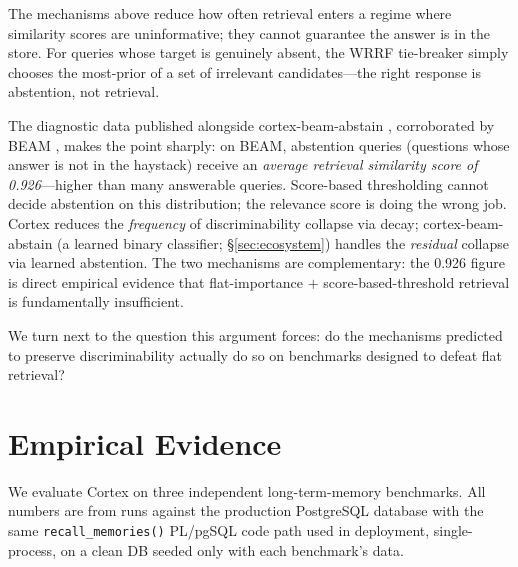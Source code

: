 \documentclass[11pt]{article}
\begin{document}
The mechanisms above reduce how often retrieval enters a regime
where similarity scores are uninformative; they cannot guarantee the
answer is in the store.  For queries whose target is genuinely
absent, the WRRF tie-breaker simply chooses the most-prior of a set
of irrelevant candidates---the right response is abstention, not
retrieval.

The diagnostic data published alongside cortex-beam-abstain
\citep{Deust2026a}, corroborated by BEAM \citep{Tavakoli2026},
makes the point sharply: on BEAM, abstention queries (questions
whose answer is not in the haystack) receive an \emph{average
retrieval similarity score of 0.926}---higher than many answerable
queries.  Score-based thresholding cannot decide abstention on this
distribution; the relevance score is doing the wrong job.  Cortex
reduces the \emph{frequency} of discriminability collapse via decay;
cortex-beam-abstain (a learned binary classifier;
\S\ref{sec:ecosystem}) handles the \emph{residual} collapse via
learned abstention.  The two mechanisms are complementary: the
0.926 figure is direct empirical evidence that flat-importance
$+$ score-based-threshold retrieval is fundamentally insufficient.

We turn next to the question this argument forces: do the
mechanisms predicted to preserve discriminability actually do so on
benchmarks designed to defeat flat retrieval?

\section{Empirical Evidence}
\label{sec:empirical}

We evaluate Cortex on three independent long-term-memory benchmarks.
All numbers are from runs against the production PostgreSQL database
with the same \texttt{recall\_memories()} PL/pgSQL code path used in
deployment, single-process, on a clean DB seeded only with each
benchmark's data.
\end{document}
